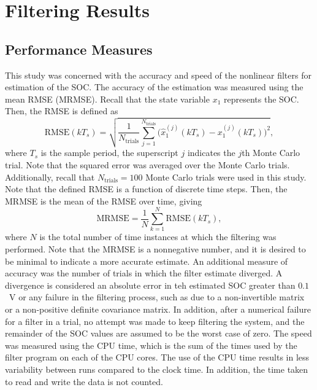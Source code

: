 \documentclass[../zhang_thesis.tex]{subfiles}
\begin{document}
\chapter{Filtering Results}


\section{Performance Measures}

This study was concerned with the accuracy and speed of the nonlinear filters for estimation of the SOC. The accuracy of the estimation was measured using the mean RMSE (MRMSE). Recall that the state variable $x_1$ represents the SOC. Then, the RMSE is defined as
\begin{equation}
    \mathrm{RMSE}(kT_s) = \sqrt{ \frac{1}{N_\text{trials}} \sum_{j=1}^{N_\text{trials}} \Big( \hat{x}_1^{(j)}(kT_s) - x_1^{(j)}(kT_s) \Big)^2 },
\end{equation}
where $T_s$ is the sample period, the superscript $j$ indicates the $j$th Monte Carlo trial. Note that the squared error was averaged over the Monte Carlo trials. Additionally, recall that $N_\text{trials}=100$ Monte Carlo trials were used in this study. Note that the defined RMSE is a function of discrete time steps. Then, the MRMSE is the mean of the RMSE over time, giving
\begin{equation}
    \mathrm{MRMSE} = \frac{1}{N} \sum_{k=1}^N \mathrm{RMSE}(kT_s),
\end{equation}
where $N$ is the total number of time instances at which the filtering was performed. Note that the MRMSE is a nonnegative number, and it is desired to be minimal to indicate a more accurate estimate. An additional measure of accuracy was the number of trials in which the filter estimate diverged. A divergence is considered an absolute error in teh estimated SOC greater than $0.1$~V or any failure in the filtering process, such as due to a non-invertible matrix or a non-positive definite covariance matrix. In addition,
after a numerical failure for a filter in a trial, no attempt was made to keep filtering the system, and the remainder of the SOC values are assumed to be the worst case of zero. The speed was measured using the CPU time, which is the sum of the times used by the filter program on each of the CPU cores. The use of the CPU time results in less variability between runs compared to the clock time. In addition, the time taken to read and write the data is not counted.
\end{document}
